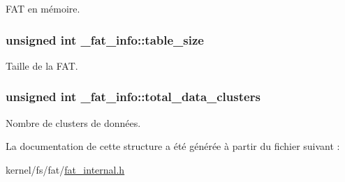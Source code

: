 F\-A\-T en mémoire. \hypertarget{struct__fat__info_af110757af771c0f3fe0c515cca1ff177}{
\subsubsection[{table\-\_\-size}]{\setlength{\rightskip}{0pt plus 5cm}unsigned int \-\_\-fat\-\_\-info\-::table\-\_\-size}}\label{struct__fat__info_af110757af771c0f3fe0c515cca1ff177}
Taille de la F\-A\-T. \hypertarget{struct__fat__info_ab43681d4b5c7cf719cd6c934cada39e3}{
\subsubsection[{total\-\_\-data\-\_\-clusters}]{\setlength{\rightskip}{0pt plus 5cm}unsigned int \-\_\-fat\-\_\-info\-::total\-\_\-data\-\_\-clusters}}\label{struct__fat__info_ab43681d4b5c7cf719cd6c934cada39e3}
Nombre de clusters de données. 

La documentation de cette structure a été générée à partir du fichier suivant \-:\begin{DoxyCompactItemize}
\item 
kernel/fs/fat/\hyperlink{fat__internal_8h}{fat\-\_\-internal.\-h}\end{DoxyCompactItemize}
